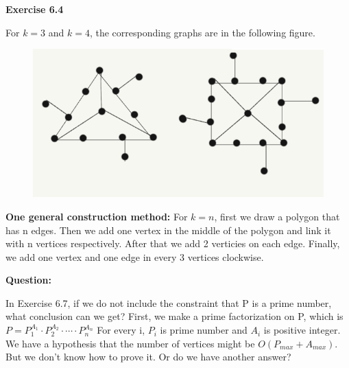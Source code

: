 \documentclass{article} %
\begin{document}
	\textbf{Exercise 6.4}\par
	For $k=3$ and $k=4$, the corresponding graphs are in the following figure.
	\begin{figure}[H]
		\centering
		\includegraphics[scale=0.8]{p2.png}
		\caption{}
		\label{fig:5}
	\end{figure}
	\textbf{One general construction method:} For $k=n$, first we draw a polygon that has n edges. Then we add one vertex in the middle of the polygon and link it with n vertices respectively. After that we add 2 verticies on each edge. Finally, we add one vertex and one edge in every 3 vertices clockwise. 

	\textbf{Question:}\par
	In Exercise 6.7, if we do not include the constraint that P is a prime number, what conclusion can we get? First, we make a prime factorization on P, which is $P=P_1^{A_1}\cdot P_2^{A_2}\cdot \cdots \cdot P_n^{A_n}$
  	For every i, $P_i$ is prime number and $A_i$ is positive integer.
	We have a hypothesis that the number of vertices might be $O(P_{max}+A_{max})$. But we don’t know how to prove it. Or do we have another answer?
\end{document}

